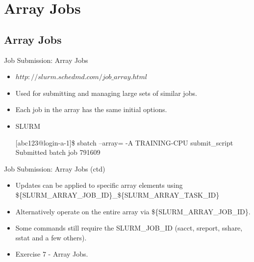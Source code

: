 \section{Array Jobs}
\subsection{Array Jobs}
\begin{frame}[fragile]{Job Submission: Array Jobs}
\begin{itemize}
\item{\alert{$http://slurm.schedmd.com/job\_array.html$}}
\item{Used for submitting and managing large sets of similar jobs.}
\item{Each job in the array has the same \alert{initial} options.}
\item{SLURM}
\begin{semiverbatim}
\scriptsize
[abc123@login-a-1]\$ sbatch --array= -A TRAINING-CPU submit\_script
Submitted batch job {\color[rgb]{0,0.6,0}791609}
\tiny
{}
\end{semiverbatim}
\smallskip
{}
\smallskip
{}
\end{itemize}
\end{frame}

\begin{frame}[fragile]{Job Submission: Array Jobs (ctd)}
\begin{itemize}
\item{Updates can be applied to specific array elements using \$\{{\color[rgb]{0,0.6,0}SLURM\_ARRAY\_JOB\_ID}\}\_\$\{{\color{red}SLURM\_ARRAY\_TASK\_ID}\}}
\item{Alternatively operate on the entire array via \$\{{\color[rgb]{0,0.6,0}SLURM\_ARRAY\_JOB\_ID}\}}.
\item{Some commands still require the SLURM\_JOB\_ID (sacct, sreport, sshare, sstat and a few others).}
\pause
\item{Exercise 7 - Array Jobs.}
\end{itemize}
\end{frame}

